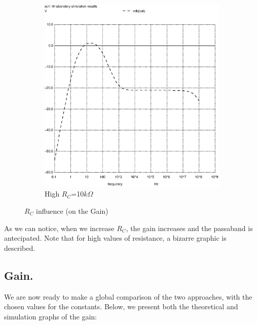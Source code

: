 \begin{figure}[h]
\begin{subfigure}{.5\textwidth}
    \includegraphics[scale=0.33]{images/rcbig.ps}
    \caption{High $R_C$=10$k\Omega$}
    \label{fig:RC_High}
\end{subfigure}
\caption{$R_C$ influence (on the Gain)}
\end{figure}


As we can notice, when we increase $R_C$, the gain increases and the passaband is antecipated. Note that for high values of resistance, a bizarre graphic is described. 

\subsection{Gain.}
\pagebreak

We are now ready to make a global comparison of the two approaches, with the chosen values for the constants. Below, we present both the theoretical and simulation graphs of the gain:

\vspace{-2.5cm}


